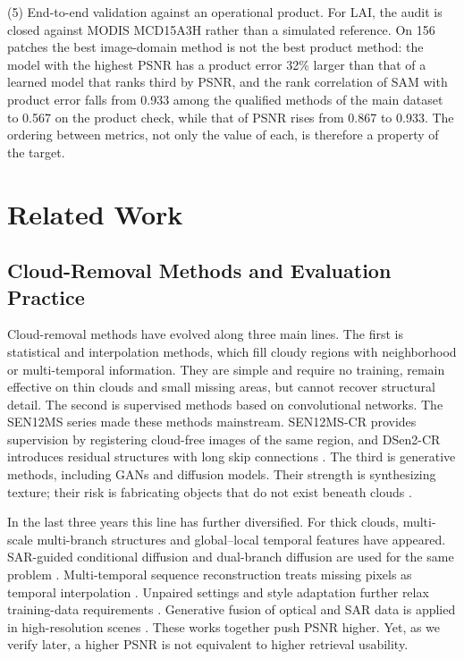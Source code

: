 \documentclass[a4paper,fleqn]{cas-dc}
\begin{document}
(5) End-to-end validation against an operational product. For LAI, the audit is closed against MODIS MCD15A3H rather than a simulated reference. On 156 patches the best image-domain method is not the best product method: the model with the highest PSNR has a product error 32\% larger than that of a learned model that ranks third by PSNR, and the rank correlation of SAM with product error falls from 0.933 among the qualified methods of the main dataset to 0.567 on the product check, while that of PSNR rises from 0.867 to 0.933. The ordering between metrics, not only the value of each, is therefore a property of the target.
\section{Related Work}

\subsection{Cloud-Removal Methods and Evaluation Practice}

Cloud-removal methods have evolved along three main lines. The first is statistical and interpolation methods, which fill cloudy regions with neighborhood or multi-temporal information. They are simple and require no training, remain effective on thin clouds and small missing areas, but cannot recover structural detail. The second is supervised methods based on convolutional networks. The SEN12MS series \cite{ref12,ref1} made these methods mainstream. SEN12MS-CR provides supervision by registering cloud-free images of the same region, and DSen2-CR introduces residual structures with long skip connections \cite{ref13}. The third is generative methods, including GANs and diffusion models. Their strength is synthesizing texture; their risk is fabricating objects that do not exist beneath clouds \cite{ref14,ref15,ref16,ref7,ref8}.

In the last three years this line has further diversified. For thick clouds, multi-scale multi-branch structures \cite{ref17} and global--local temporal features \cite{ref18} have appeared. SAR-guided conditional diffusion and dual-branch diffusion are used for the same problem \cite{ref7,ref19,ref8}. Multi-temporal sequence reconstruction treats missing pixels as temporal interpolation \cite{ref20}. Unpaired settings and style adaptation further relax training-data requirements \cite{ref15}. Generative fusion of optical and SAR data is applied in high-resolution scenes \cite{ref21}. These works together push PSNR higher. Yet, as we verify later, a higher PSNR is not equivalent to higher retrieval usability.
\end{document}
